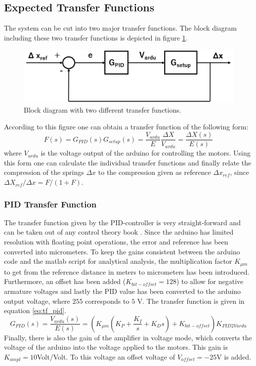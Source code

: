 	\subsection{Expected Transfer Functions}
	The system can be cut into two major transfer functions. The block diagram including these two transfer functions is depicted in figure \ref{fig:2tf_block_diagram}. 
	
	\begin{figure}[h!]
		\centering
		\includegraphics[width=0.6\linewidth]{Figs/2tf_block_diagram}
		\caption{Block diagram with two different transfer functions.}
		\label{fig:2tf_block_diagram}
	\end{figure}
	According to this figure one can obtain a transfer function of the following form:
	\begin{equation}
		F(s) = G_{PID}(s)G_{setup}(s) = \frac{V_{ardu}}{E}\frac{\Delta X}{V_{ardu}} = \frac{\Delta X(s)}{E(s)}
		\label{eq:complete_tf}
	\end{equation}
	where $V_{ardu}$ is the voltage output of the arduino for controlling the motors. Using this form one can calculate the individual transfer functions and finally relate the compression of the springs $\Delta x$ to the compression given as reference $\Delta x_{ref}$, since $\Delta X_{ref} / \Delta x = F/(1+F)$.
	
	\subsubsection{PID Transfer Function}
	The transfer function given by the PID-controller is very straight-forward and can be taken out of any control theory book \cite{Dutton1997}. 
	Since the arduino has limited resolution with floating point operations, the error and reference has been converted into micrometers. To keep the gains consistent between the arduino code and the matlab script for analytical analysis, the multiplication factor $K_{\mu m}$ to get from the reference distance in meters to micrometers has been introduced. Furthermore, an offset has been added ($K_{bit-offset} = 128$) to allow for negative armature voltages and lastly the PID value has been converted to the arduino output voltage, where $255$ corresponds to $5$ V. The transfer function is given in equation \ref{eq:tf_pid}. 
	\begin{equation}
		G_{PID} (s) = \frac{V_{ardu}(s)}{E(s)} = (K_{\mu m} (K_P + \frac{K_I}{s} + K_Ds) +K_{bit-offset}) K_{PID2Vardu}
		\label{eq:tf_pid}
	\end{equation}
	Finally, there is also the gain of the amplifier in voltage mode, which converts the voltage of the arduino into the voltage applied to the motors. This gain is $K_{ampl} = 10$Volt/Volt. To this voltage an offset voltage of $V_{offset} = -25$V is added.\\
	
